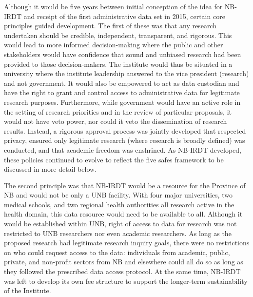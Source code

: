 \documentclass[
]{book}
\begin{document}
Although it would be five years between initial conception of the idea for NB-IRDT and receipt of the first administrative data set in 2015, certain core principles guided development. The first of these was that any research undertaken should be credible, independent, transparent, and rigorous. This would lead to more informed decision-making where the public and other stakeholders would have confidence that sound and unbiased research had been provided to those decision-makers. The institute would thus be situated in a university where the institute leadership answered to the vice president (research) and not government. It would also be empowered to act as data custodian and have the right to grant and control access to administrative data for legitimate research purposes. Furthermore, while government would have an active role in the setting of research priorities and in the review of particular proposals, it would not have veto power, nor could it veto the dissemination of research results. Instead, a rigorous approval process was jointly developed that respected privacy, ensured only legitimate research (where research is broadly defined) was conducted, and that academic freedom was enshrined. As NB-IRDT developed, these policies continued to evolve to reflect the five safes framework to be discussed in more detail below.

The second principle was that NB-IRDT would be a resource for the Province of NB and would not be only a UNB facility. With four major universities, two medical schools, and two regional health authorities all research active in the health domain, this data resource would need to be available to all. Although it would be established within UNB, right of access to data for research was not restricted to UNB researchers nor even academic researchers. As long as the proposed research had legitimate research inquiry goals, there were no restrictions on who could request access to the data: individuals from academic, public, private, and non-profit sectors from NB and elsewhere could all do so as long as they followed the prescribed data access protocol. At the same time, NB-IRDT was left to develop its own fee structure to support the longer-term sustainability of the Institute.
\end{document}
